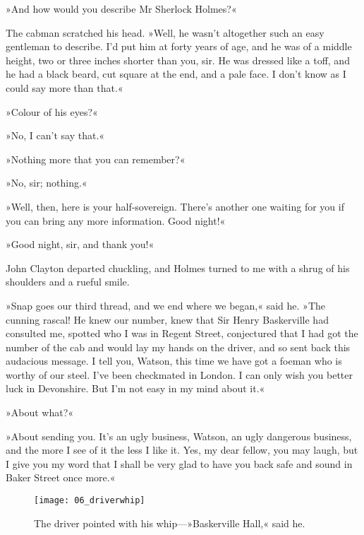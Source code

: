 »And how would you describe Mr Sherlock Holmes?«

The cabman scratched his head. »Well, he wasn't altogether such an easy gentleman to describe. I'd put him at forty years of age, and he was of a middle height, two or three inches shorter than you, sir. He was dressed like a toff, and he had a black beard, cut square at the end, and a pale face. I don't know as I could say more than that.«

»Colour of his eyes?«

»No, I can't say that.«

»Nothing more that you can remember?«

»No, sir; nothing.«

»Well, then, here is your half-sovereign. There's another one waiting for you if you can bring any more information. Good night!«

»Good night, sir, and thank you!«

John Clayton departed chuckling, and Holmes turned to me with a shrug of his shoulders and a rueful smile.

»Snap goes our third thread, and we end where we began,« said he. »The cunning rascal! He knew our number, knew that Sir Henry Baskerville had consulted me, spotted who I was in Regent Street, conjectured that I had got the number of the cab and would lay my hands on the driver, and so sent back this audacious message. I tell you, Watson, this time we have got a foeman who is worthy of our steel. I've been checkmated in London. I can only wish you better luck in Devonshire. But I'm not easy in my mind about it.«

»About what?«

»About sending you. It's an ugly business, Watson, an ugly dangerous business, and the more I see of it the less I like it. Yes, my dear fellow, you may laugh, but I give you my word that I shall be very glad to have you back safe and sound in Baker Street once more.«
\clearpage
\vfill
\begin{figure}[hp!]
\centering
\texttt{[image: 06\_driverwhip]}
\caption{The driver pointed with his whip—»Baskerville Hall,« said he.}
\end{figure}
\vfill
\thispagestyle{empty}
\clearpage

